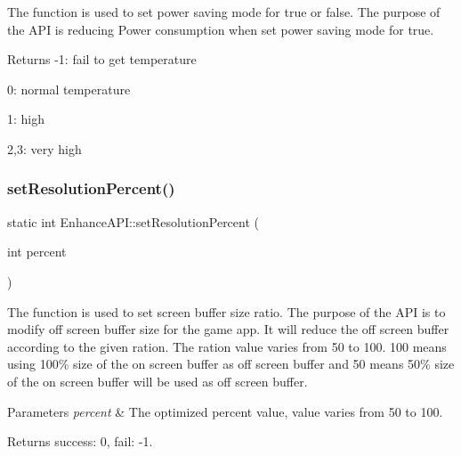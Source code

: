 The function is used to set power saving mode for true or false. The purpose of the A\+PI is reducing Power consumption when set power saving mode for true. 

\begin{DoxyReturn}{Returns}
-\/1\+: fail to get temperature
\begin{DoxyItemize}
\item 0\+: normal temperature
\item 1\+: high
\item 2,3\+: very high 
\end{DoxyItemize}
\end{DoxyReturn}
\mbox{\label{classEnhanceAPI_a06955ddbf64fd06570427e35654a314c}} 
\subsubsection{\texorpdfstring{set\+Resolution\+Percent()}{setResolutionPercent()}\hspace{0.1cm}{\footnotesize\ttfamily [1/2]}}
{\footnotesize\ttfamily static int Enhance\+A\+P\+I\+::set\+Resolution\+Percent (\begin{DoxyParamCaption}\item[{int}]{percent }\end{DoxyParamCaption})\hspace{0.3cm}{\ttfamily [static]}}



The function is used to set screen buffer size ratio. The purpose of the A\+PI is to modify off screen buffer size for the game app. It will reduce the off screen buffer according to the given ration. The ration value varies from 50 to 100. 100 means using 100\% size of the on screen buffer as off screen buffer and 50 means 50\% size of the on screen buffer will be used as off screen buffer. 


\begin{DoxyParams}{Parameters}
{\em percent} & The optimized percent value, value varies from 50 to 100. \\
\hline
\end{DoxyParams}
\begin{DoxyReturn}{Returns}
success\+: 0, fail\+: -\/1. 
\end{DoxyReturn}
\mbox{\label{classEnhanceAPI_a761e06b7b1a111b7db223cc43f7a27a7}} 
